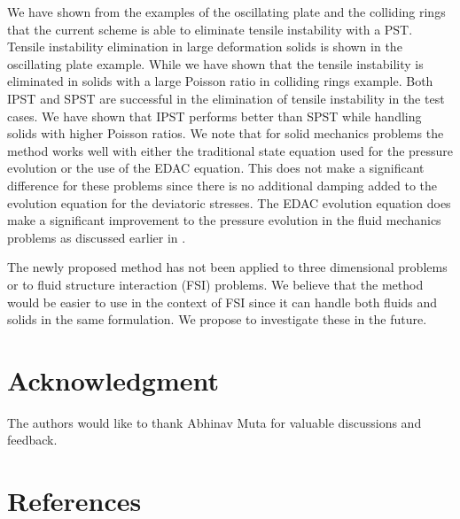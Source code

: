 \documentclass[preprint,12pt]{elsarticle}
\begin{document}
We have shown from the examples of the oscillating plate and the colliding
rings that the current scheme is able to eliminate tensile instability with a
PST. Tensile instability elimination in large deformation solids is shown in
the oscillating plate example. While we have shown that the tensile
instability is eliminated in solids with a large Poisson ratio in colliding
rings example. Both IPST and SPST are successful in the elimination of tensile
instability in the test cases. We have shown that IPST performs better than
SPST while handling solids with higher Poisson ratios. We note that for solid
mechanics problems the method works well with either the traditional state
equation used for the pressure evolution or the use of the EDAC equation. This
does not make a significant difference for these problems since there is no
additional damping added to the evolution equation for the deviatoric
stresses. The EDAC evolution equation does make a significant improvement to
the pressure evolution in the fluid mechanics problems as discussed earlier in
\cite{edac-sph:cf:2019}.

The newly proposed method has not been applied to three dimensional problems
or to fluid structure interaction (FSI) problems. We believe that the method
would be easier to use in the context of FSI since it can handle both fluids
and solids in the same formulation. We propose to investigate these in the
future.

\section*{Acknowledgment}

The authors would like to thank Abhinav Muta for valuable discussions and
feedback.

\section*{References}


\end{document}
